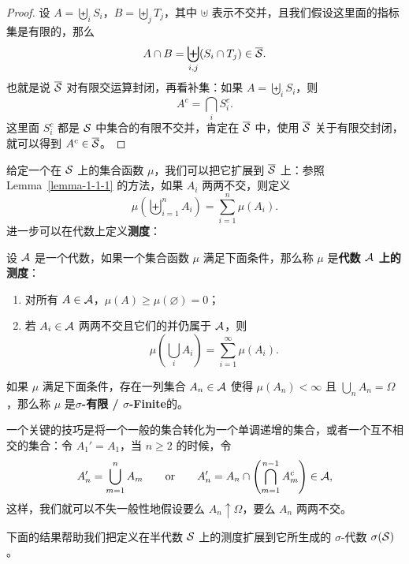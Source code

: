 \begin{proof}
    设 $A = \biguplus_i S_i$，$B = \biguplus_j T_j$，其中 $\uplus$ 表示不交并，且我们假设这里面的指标集是有限的，那么
    \[
        A \cap B = \biguplus_{i,j} (S_i \cap T_j) \in \overline{\mathcal{S}}.
    \]
    也就是说 $\overline{\mathcal{S}}$ 对有限交运算封闭，再看补集：如果 $A = \biguplus_i S_i$，则
    \[
        A^c = \bigcap_i S_i^c.
    \]
    这里面 $S_i^c$ 都是 $\mathcal{S}$ 中集合的有限不交并，肯定在 $\overline{\mathcal{S}}$ 中，使用 $\overline{\mathcal{S}}$ 关于有限交封闭，就可以得到 $A^c \in \overline{\mathcal{S}}$。
\end{proof}

给定一个在 $\mathcal{S}$ 上的集合函数 $\mu$，我们可以把它扩展到 $\overline{\mathcal{S}}$ 上：参照 Lemma~\ref{lemma-1-1-1} 的方法，如果 $A_i$ 两两不交，则定义
\[
    \mu\!\left( \biguplus_{i=1}^n A_i \right) = \sum_{i=1}^n \mu(A_i).
\]
进一步可以在代数上定义{\normalfont\bfseries 测度}：

\begin{definition}
    设 $\mathcal{A}$ 是一个代数，如果一个集合函数 $\mu$ 满足下面条件，那么称 $\mu$ 是{\normalfont\bfseries 代数 $\mathcal{A}$ 上的测度}：
    \begin{enumerate}
        \item 对所有 $A \in \mathcal{A}$，$\mu(A) \ge \mu(\varnothing) = 0$；
        \item 若 $A_i \in \mathcal{A}$ 两两不交且它们的并仍属于 $\mathcal{A}$，则
              \[
                  \mu\!\left( \bigcup_i A_i \right) = \sum_{i=1}^{\infty} \mu(A_i).
              \]
    \end{enumerate}
\end{definition}

如果 $\mu$ 满足下面条件，存在一列集合 $A_n \in \mathcal{A}$ 使得 $\mu(A_n) < \infty$ 且 $\bigcup_n A_n = \Omega$，那么称 $\mu$ 是{\normalfont\bfseries $\sigma$-有限 / $\sigma$-Finite}的。

一个关键的技巧是将一个一般的集合转化为一个单调递增的集合，或者一个互不相交的集合：令 $A_1' = A_1$，当 $n \ge 2$ 的时候，令
\[
    A_n' = \bigcup_{m=1}^n A_m
    \qquad \text{or} \qquad
    A_n' = A_n \cap \left( \bigcap_{m=1}^{n-1} A_m^c \right) \in \mathcal{A},
\]
这样，我们就可以不失一般性地假设要么 $A_n \uparrow \Omega$，要么 $A_n$ 两两不交。

下面的结果帮助我们把定义在半代数 $\mathcal{S}$ 上的测度扩展到它所生成的 $\sigma$-代数 $\sigma(\mathcal{S})$。

